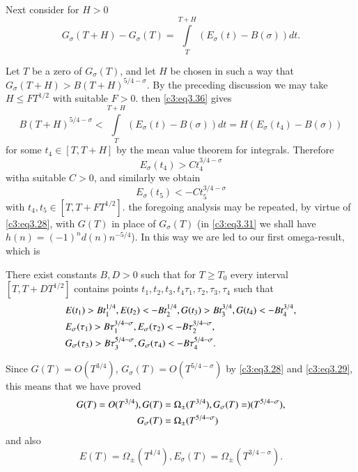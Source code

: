 Next consider for $H> 0$
\begin{equation}
  G_\sigma (T+ H) - G_\sigma (T) = \int\limits_T^{T+H} (E_\sigma (t) -
  B(\sigma))dt.\label{c3:eq3.36}
\end{equation}

Let $T$ be a zero of $G_\sigma(T)$, and let $H$ be chosen in such a
way that $G_\sigma (T+ H)> B(T+ H)^{5/4-\sigma}$. By the preceding
discussion we may take $H \leq FT^{1/2}$ with suitable $F> 0$. then
\eqref{c3:eq3.36} gives
$$
B(T + H)^{5/4-\sigma} < \int\limits_T^{T+H} (E_\sigma(t) -
B(\sigma))dt = H(E_\sigma (t_4) - B(\sigma))
$$ 
for some $t_4 \in [T, T+ H]$ by the mean value theorem for
integrals. Therefore 
$$
E_\sigma (t_4) > Ct_4^{3/4-\sigma}
$$
with\pageoriginale a suitable $C>0$, and similarly we obtain
$$
E_\sigma (t_5) < -C t_5^{3/4-\sigma}
$$
with $t_4, t_5 \in [T, T+ FT^{1/2}]$. the foregoing analysis may be
repeated, by virtue of \eqref{c3:eq3.28}, with $G(T)$ in place of
$G_\sigma (T)$ (in \eqref{c3:eq3.31} we shall have $h(n) = (-1)^n d(n)
n^{-5/4}$). In this way we are led to our first omega-result, which is 

\begin{thm}\label{c3:thm3.3}
  There exist constants $B, D> 0$ such that for $T \geq T_0$ every
  interval $[T, T + DT^{1/2}]$ contains points $t_1, t_2, t_3, t_4
  \tau_1, \tau_2, \tau_3, \tau_4$ such that
  \begin{align}
    & E(t_1) > Bt_1^{1/4}, E(t_2) < - Bt_2^{1/4}, G(t_3) > B t_3^{3/4},
    G(t_4)< -Bt_4^{3/4}, \label{c3:eq3.37}\\
    & E_\sigma (\tau_1)  > B \tau_1^{3/4-\sigma}, E_\sigma (\tau_2)< -B
    \tau_2^{3/4-\sigma},\label{c3:eq3.38}\\
    & G_\sigma (\tau_3) > B \tau_3^{5/4-\sigma}, G_\sigma (\tau_4) < -
    B \tau_4^{5/4-\sigma}.\notag
  \end{align}
\end{thm}

Since $G(T)= O(T^{3/4})$, $G_\sigma (T)= O(T^{5/4-\sigma})$ by
\eqref{c3:eq3.28} and \eqref{c3:eq3.29}, this means that we have
proved
\begin{align}
  G(T) = O(T^{3/4}), G(T) & = \Omega_{\pm}(T^{3/4}), G_\sigma (T) = )
  (T^{5/4-\sigma}),\notag \\
   G_\sigma (T) &= \Omega_\pm (T^{5/4-\sigma})\label{c3:eq3.39}
\end{align}
and also
\begin{equation}
  E(T) = \Omega_\pm (T^{1/4}), E_\sigma (T) = \Omega_\pm
  (T^{3/4-\sigma}).\label{c3:eq3.40} 
\end{equation}

